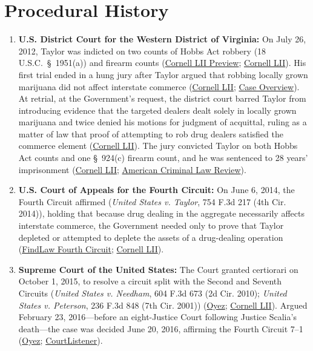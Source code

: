 \documentclass[12pt]{article}
\begin{document}
\section{Procedural History}
\begin{enumerate}
\item \textbf{U.S. District Court for the Western District of Virginia:} On July 26, 2012, Taylor was indicted on two counts of Hobbs Act robbery (18 U.S.C.\ \S~1951(a)) and firearm counts (\href{https://www.law.cornell.edu/supct/cert/14-6166}{Cornell LII Preview}; \href{https://www.law.cornell.edu/supremecourt/text/14-6166}{Cornell LII}). His first trial ended in a hung jury after Taylor argued that robbing locally grown marijuana did not affect interstate commerce (\href{https://www.law.cornell.edu/supremecourt/text/14-6166}{Cornell LII}; \href{https://en.wikipedia.org/wiki/Taylor_v._United_States_(2016)}{Case Overview}). At retrial, at the Government's request, the district court barred Taylor from introducing evidence that the targeted dealers dealt solely in locally grown marijuana and twice denied his motions for judgment of acquittal, ruling as a matter of law that proof of attempting to rob drug dealers satisfied the commerce element (\href{https://www.law.cornell.edu/supremecourt/text/14-6166}{Cornell LII}). The jury convicted Taylor on both Hobbs Act counts and one \S~924(c) firearm count, and he was sentenced to 28 years' imprisonment (\href{https://www.law.cornell.edu/supremecourt/text/14-6166}{Cornell LII}; \href{https://www.law.georgetown.edu/american-criminal-law-review/wp-content/uploads/sites/15/2023/02/53-0-Evola-you-shall-go-no-further.pdf}{American Criminal Law Review}).
\item \textbf{U.S. Court of Appeals for the Fourth Circuit:} On June 6, 2014, the Fourth Circuit affirmed (\textit{United States v. Taylor}, 754 F.3d 217 (4th Cir. 2014)), holding that because drug dealing in the aggregate necessarily affects interstate commerce, the Government needed only to prove that Taylor depleted or attempted to deplete the assets of a drug-dealing operation (\href{https://caselaw.findlaw.com/court/us-4th-circuit/1669252.html}{FindLaw Fourth Circuit}; \href{https://www.law.cornell.edu/supremecourt/text/14-6166}{Cornell LII}).
\item \textbf{Supreme Court of the United States:} The Court granted certiorari on October 1, 2015, to resolve a circuit split with the Second and Seventh Circuits (\textit{United States v. Needham}, 604 F.3d 673 (2d Cir. 2010); \textit{United States v. Peterson}, 236 F.3d 848 (7th Cir. 2001)) (\href{https://www.oyez.org/cases/2015/14-6166}{Oyez}; \href{https://www.law.cornell.edu/supremecourt/text/14-6166}{Cornell LII}). Argued February 23, 2016---before an eight-Justice Court following Justice Scalia's death---the case was decided June 20, 2016, affirming the Fourth Circuit 7--1 (\href{https://www.oyez.org/cases/2015/14-6166}{Oyez}; \href{https://www.courtlistener.com/opinion/3214883/taylor-v-united-states/}{CourtListener}).
\end{enumerate}
\end{document}
